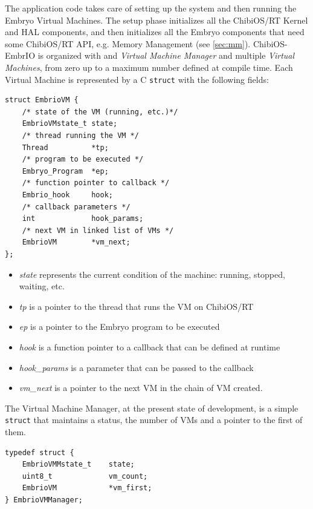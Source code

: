 \documentclass[a4paper,10pt]{article}
\begin{document}
\begin{multicols}{2}
The application code takes care of setting up the system and then running the Embryo Virtual Machines. The setup phase initializes all the ChibiOS/RT Kernel and HAL components, and then initializes all the Embryo components that need some ChibiOS/RT API, e.g. Memory Management (see \ref{sec:mm}).\newline
ChibiOS-EmbrIO is organized with and \textit{Virtual Machine Manager} and multiple \textit{Virtual Machines}, from zero up to a maximum number defined at compile time. Each Virtual Machine is represented by a C \texttt{struct} with the following fields:

\begin{lstlisting}[caption={EmbrIO VM}]
struct EmbrioVM {
	/* state of the VM (running, etc.)*/
	EmbrioVMstate_t	state;
	/* thread running the VM */
	Thread			*tp;
	/* program to be executed */
	Embryo_Program	*ep;
	/* function pointer to callback */
	Embrio_hook		hook;
	/* callback parameters */
	int				hook_params;
	/* next VM in linked list of VMs */
	EmbrioVM		*vm_next;
};

\end{lstlisting}

\begin{itemize}
\item \textit{state} represents the current condition of the machine: running, stopped, waiting, etc.
\item \textit{tp} is a pointer to the thread that runs the VM on ChibiOS/RT
\item \textit{ep} is a pointer to the Embryo program to be executed
\item \textit{hook} is a function pointer to a callback that can be defined at runtime
\item \textit{hook\_params} is a parameter that can be passed to the callback
\item \textit{vm\_next} is a pointer to the next VM in the chain of VM created.
\end{itemize}


The Virtual Machine Manager, at the present state of development, is a simple \texttt{struct} that maintains a status, the number of VMs and a pointer to the first of them.

\begin{lstlisting}[caption={EmbrIO VM}]
typedef struct {
	EmbrioVMMstate_t	state;
	uint8_t				vm_count;
	EmbrioVM			*vm_first;
} EmbrioVMManager;
\end{lstlisting}




\end{multicols}
\end{document}
